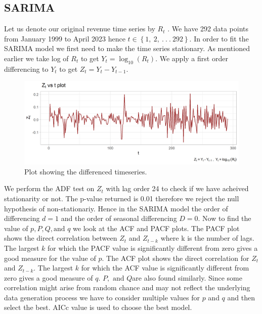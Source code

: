 \documentclass[
]{article}
\begin{document}
\hypertarget{sarima}{%
\subsection{SARIMA}\label{sarima}}

Let us denote our original revenue time series by \(R_{t}\) . We have
292 data points from January 1999 to April 2023 hence
\(t \in \left\{ 1,\ 2,\ .\ .\ .\ 292 \right\}\). In order to fit the
SARIMA model we first need to make the time series stationary. As
mentioned earlier we take log of \(R_{t}\) to get
\(Y_{t} = \log_{10}(R_{t})\). We apply a first order differencing to
\(Y_{t}\) to get \(Z_{t} = Y_{t} - Y_{t - 1}\).

\begin{figure}
\centering
\includegraphics{Plots/Ztplot.png}
\caption{Plot showing the differenced timeseries.}
\end{figure}

We perform the ADF test on \(Z_{t}\) with lag order 24 to check if we
have acheived stationarity or not. The p-value returned is 0.01
therefore we reject the null hypothesis of non-stationariy. Hence in the
SARIMA model the order of differencing \(d = 1\) and the order of
seasonal differencing \(D=0\). Now to find the value of
\(p, P, Q, \text{and } q\) we look at the ACF and PACF plots. The PACF
plot shows the direct correlation between \(Z_{t}\) and \(Z_{t - k}\)
where k is the number of lags. The largest \(k\) for which the PACF
value is significantly different from zero gives a good measure for the
value of \(p\). The ACF plot shows the direct correlation for
\(Z_{t}\)and \(Z_{t - k}\). The largest \(k\) for which the ACF value is
significantly different from zero gives a good measure of \(q\).
\(P,\text{ and } Q\)are also found similarly. Since some correlation
might arise from random chance and may not reflect the underlying data
generation process we have to consider multiple values for \(p\) and
\(q\) and then select the best. AICc value is used to choose the best
model.
\end{document}
